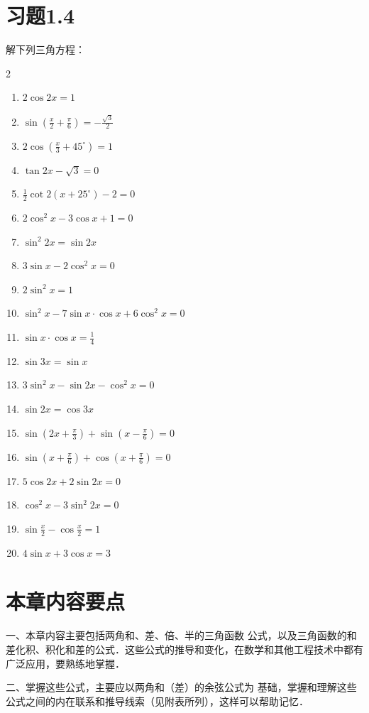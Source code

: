 \section*{习题1.4}
解下列三角方程：
\begin{multicols}{2}
    \begin{enumerate}
    \item $2\cos 2x=1$
    \item $\sin\left(\frac{x}{2}+\frac{\pi}{6}\right)=-\frac{\sqrt{3}}{2}$
    \item $2\cos\left(\frac{x}{3}+45^{\circ}\right)=1$
    \item $\tan2x-\sqrt{3}=0$
    \item $\frac{1}{2}\cot2(x+25^{\circ})-2=0$
    \item $2\cos^2x-3\cos x+1=0$
    \item $\sin^2 2x=\sin 2x$
    \item $3\sin x-2\cos^2 x=0$
    \item $2\sin^2 x=1$
    \item $\sin^2 x-7\sin x\cdot \cos x+6\cos^2 x=0$
    \item $\sin x\cdot\cos x=\frac{1}{4}$
    \item $\sin 3x=\sin x$
    \item $3\sin^2 x-\sin 2x-\cos^2x=0$
    \item $\sin 2x=\cos 3x$
    \item $\sin\left(2x+\frac{\pi}{3}\right)+\sin\left(x-\frac{\pi}{6}\right)=0$
    \item $\sin\left(x+\frac{\pi}{6}\right)+\cos\left(x+\frac{\pi}{6}\right)=0$
    \item $5\cos2x+2\sin2x=0$
    \item $\cos^2x-3\sin^2 2x=0$
    \item $\sin\frac{x}{2}-\cos\frac{x}{2}=1$
    \item $4\sin x+3\cos x=3$
\end{enumerate}
\end{multicols}

\section*{本章内容要点}
一、本章内容主要包括两角和、差、倍、半的三角函数
公式，以及三角函数的和差化积、积化和差的公式．这些公式的推导和变化，在数学和其他工程技术中都有广泛应用，要熟练地掌握．

二、掌握这些公式，主要应以两角和（差）的余弦公式为
基础，掌握和理解这些公式之间的内在联系和推导线索（见附表所列），这样可以帮助记忆．

